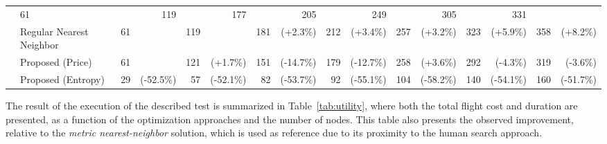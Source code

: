 \begin{table}
{\begin{tabular}{l|l|r@{~}r|r@{~}r|r@{~}r|r@{~}r|r@{~}r|r@{~}r|r@{~}r|}
                                                & \cellcolor{Gray}61 & \cellcolor{Gray}
                                                & \cellcolor{Gray}119 & \cellcolor{Gray}
                                                & \cellcolor{Gray}177 & \cellcolor{Gray}
                                                & \cellcolor{Gray}205 & \cellcolor{Gray}
                                                & \cellcolor{Gray}249 & \cellcolor{Gray}
                                                & \cellcolor{Gray}305 & \cellcolor{Gray}
                                                & \cellcolor{Gray}331 & \cellcolor{Gray}  \\
                            & Regular Nearest Neighbor       & 61 & 
                                                & 119 & 
                                                & 181 & {\color{red}(+2.3\%)}
                                                & 212 & {\color{red}(+3.4\%)}
                                                & 257 & {\color{red}(+3.2\%)}
                                                & 323 & {\color{red}(+5.9\%)}
                                                & 358 & {\color{red}(+8.2\%)}  \\
                            & Proposed (Price)   & 61 & 
                                                & 121 & {\color{red}(+1.7\%)}
                                                & 151 & {\color{green}(-14.7\%)}
                                                & 179 & {\color{green}(-12.7\%)}
                                                & 258 & {\color{green}(+3.6\%)}
                                                & 292 & {\color{green}(-4.3\%)}
                                                & 319 & {\color{green}(-3.6\%)}  \\
                            & Proposed (Entropy)& 29 & {\color{green}(-52.5\%)}
                                                & 57 & {\color{green}(-52.1\%)}
                                                & 82 & {\color{green}(-53.7\%)}
                                                & 92 & {\color{green}(-55.1\%)}
                                                & 104 & {\color{green}(-58.2\%)}
                                                & 140 & {\color{green}(-54.1\%)}
                                                & 160 & {\color{green}(-51.7\%)} \\ \hline 
  \end{tabular}
}
\end{table}

The result of the execution of the described test is summarized in Table~\ref{tab:utility}, where both the total flight cost and duration are presented, as a function of the optimization approaches and the number of nodes. This table also presents the observed improvement, relative to the \textit{metric nearest-neighbor} solution, which is used as reference due to its proximity to the human search approach.

